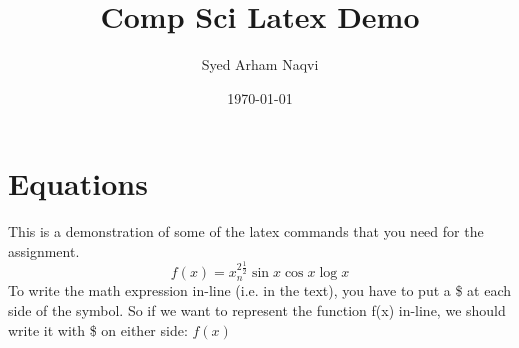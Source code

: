 \documentclass{article} %
\title{Comp Sci Latex Demo}
\author{Syed Arham Naqvi}
\date{\today}
\begin{document}
\maketitle

\section{Equations}
This is a demonstration of some of the latex commands that you need for the assignment.
\begin{equation}
    f(x) = x_n^{2\frac{1}{2}} \sin{x} \cos{x} \log{x}
\end{equation}
To write the math expression in-line (i.e. in the text),
you have to put a \$ at each side of the symbol.
So if we want to represent the function f(x) in-line,
we should write it with \$ on either side: $f(x)$
\end{document}
